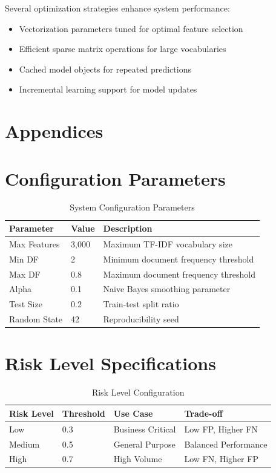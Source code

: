 \documentclass[12pt,a4paper]{article}
\begin{document}
Several optimization strategies enhance system performance:

\begin{itemize}
    \item Vectorization parameters tuned for optimal feature selection
    \item Efficient sparse matrix operations for large vocabularies
    \item Cached model objects for repeated predictions
    \item Incremental learning support for model updates
\end{itemize}

\section{Appendices}

\appendix

\section{Configuration Parameters}

\begin{table}[H]
\centering
\caption{System Configuration Parameters}
\begin{tabular}{@{}lll@{}}
\toprule
\textbf{Parameter} & \textbf{Value} & \textbf{Description} \\
\midrule
Max Features & 3,000 & Maximum TF-IDF vocabulary size \\
Min DF & 2 & Minimum document frequency threshold \\
Max DF & 0.8 & Maximum document frequency threshold \\
Alpha & 0.1 & Naive Bayes smoothing parameter \\
Test Size & 0.2 & Train-test split ratio \\
Random State & 42 & Reproducibility seed \\
\bottomrule
\end{tabular}
\end{table}

\section{Risk Level Specifications}

\begin{table}[H]
\centering
\caption{Risk Level Configuration}
\begin{tabular}{@{}llll@{}}
\toprule
\textbf{Risk Level} & \textbf{Threshold} & \textbf{Use Case} & \textbf{Trade-off} \\
\midrule
Low & 0.3 & Business Critical & Low FP, Higher FN \\
Medium & 0.5 & General Purpose & Balanced Performance \\
High & 0.7 & High Volume & Low FN, Higher FP \\
\bottomrule
\end{tabular}
\end{table}
\end{document}
